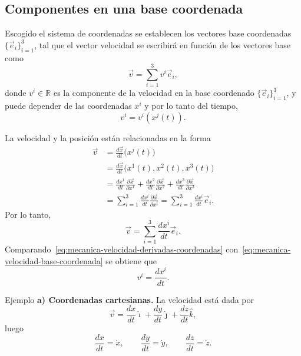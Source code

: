 \documentclass[../apunte_mecanica_clasica.tex]{subfiles}%
\begin{document}
\subsection{Componentes en una base coordenada}

Escogido el sistema de coordenadas se establecen los vectores base coordenadas $\{\vec e_i\}_{i=1}^{3}$, tal que el vector velocidad se escribirá en función de los vectores base como
\begin{equation}
    \vec v=\sum_{i=1}^{3}v^i\vec e_i,
    \label{eq:mecanica-velocidad-base-coordenada}
\end{equation}
donde $v^i\in\mathbb R$ es la componente de la velocidad en la base coordenado $\{\vec e_i\}_{i=1}^{3}$, y puede depender de las coordenadas $x^i$ y por lo tanto del tiempo,
\begin{equation}
    v^i=v^i(x^j(t)).
    \label{eq:mecanica-componentes-velocidad-dependencia}
\end{equation}

La velocidad y la posición están relacionadas en la forma
\begin{align}
    \vec v
    &=\frac{d\vec x}{dt}\bigl(x^j(t)\bigr) \\
    &=\frac{d\vec x}{dt}\bigl(x^1(t),x^2(t),x^3(t)\bigr) \\
    &=\frac{dx^1}{dt}\frac{\partial \vec x}{\partial x^1}
     +\frac{dx^2}{dt}\frac{\partial \vec x}{\partial x^2}
     +\frac{dx^3}{dt}\frac{\partial \vec x}{\partial x^3} \\
    &=\sum_{i=1}^{3}\frac{dx^i}{dt}\frac{\partial \vec x}{\partial x^i}
     =\sum_{i=1}^{3}\frac{dx^i}{dt}\vec e_i .
\end{align}
Por lo tanto,
\begin{equation}
    \vec v=\sum_{i=1}^{3}\frac{dx^i}{dt}\vec e_i.
    \label{eq:mecanica-velocidad-derivadas-coordenadas}
\end{equation}
Comparando~\eqref{eq:mecanica-velocidad-derivadas-coordenadas} con~\eqref{eq:mecanica-velocidad-base-coordenada} se obtiene que
\begin{equation}
    v^i=\frac{dx^i}{dt}.
    \label{eq:mecanica-componentes-velocidad}
\end{equation}

\begin{apuntebloque}{Ejemplo}
\textbf{a) Coordenadas cartesianas.} La velocidad está dada por
\begin{equation*}
    \vec v=\frac{dx}{dt}\hat{\imath}+\frac{dy}{dt}\hat{\jmath}+\frac{dz}{dt}\hat{k},
\end{equation*}
luego
\begin{equation*}
    \frac{dx}{dt}=\dot x,
    \qquad
    \frac{dy}{dt}=\dot y,
    \qquad
    \frac{dz}{dt}=\dot z.
\end{equation*}
\end{apuntebloque}
\end{document}
